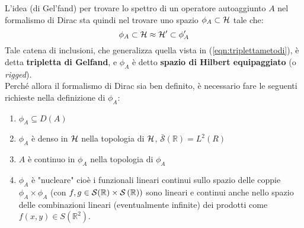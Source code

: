 \documentclass[12pt]{article}
\begin{document}
L'idea (di Gel'fand) per trovare lo spettro di un operatore autoaggiunto $A$ nel formalismo di Dirac sta quindi nel trovare uno spazio $\phi_A \subset \mathcal{H}$ tale che:
\begin{equation}
\phi_A \subset \mathcal{H} \approx \mathcal{H}' \subset \phi_A'
\label{tripletta-gelfand}
\end{equation}
Tale catena di inclusioni, che generalizza quella vista in (\ref{eqn:triplettametodi}), è detta \textbf{tripletta di Gelfand}, e $\phi_A$ è detto \textbf{spazio di Hilbert equipaggiato} (o \textit{rigged}).\\
Perché allora il formalismo di Dirac sia ben definito, è necessario fare le seguenti richieste nella definizione di $\phi_A$:
\begin{enumerate}
    \item $\displaystyle \phi_A\subseteq D\left(A\right)$
	\item $\phi_A$ è denso in $\mathcal{H}$ nella topologia di $\mathcal{H}$, $\bar{\mathcal{S}}\left(\mathbb{R}\right)=L^2(R)$
	\item $A$ è continuo in $\phi_A$ nella topologia di $\phi_A$
	\item $\phi_A$ è "nucleare" cioè i funzionali lineari continui sullo spazio delle coppie $\phi_A\times \phi_A$ (con $f,g\in \mathcal{S}(\mathbb{R})\times \mathcal{S}\left(\mathbb{R}\right))$ sono lineari e continui anche nello spazio delle combinazioni lineari (eventualmente infinite) dei prodotti come $f\left(x,y\right)\in S\left(\mathbb{R}^2\right)$.\\
	

\end{enumerate}
\end{document}
